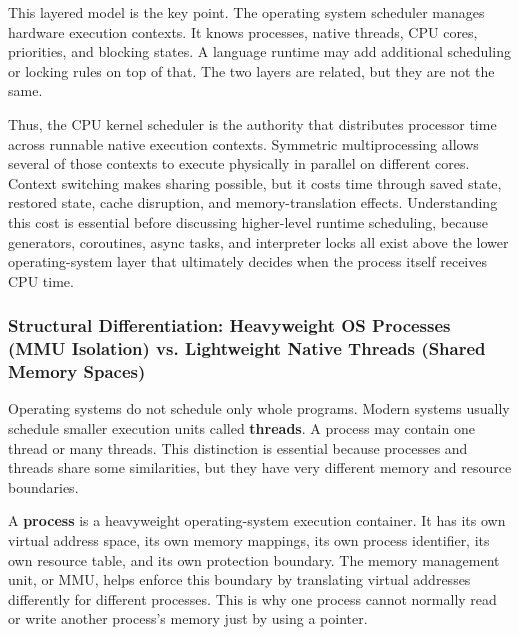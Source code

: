 This layered model is the key point. The operating system scheduler manages hardware execution contexts. It knows processes, native threads, CPU cores, priorities, and blocking states. A language runtime may add additional scheduling or locking rules on top of that. The two layers are related, but they are not the same.

Thus, the CPU kernel scheduler is the authority that distributes processor time across runnable native execution contexts. Symmetric multiprocessing allows several of those contexts to execute physically in parallel on different cores. Context switching makes sharing possible, but it costs time through saved state, restored state, cache disruption, and memory-translation effects. Understanding this cost is essential before discussing higher-level runtime scheduling, because generators, coroutines, async tasks, and interpreter locks all exist above the lower operating-system layer that ultimately decides when the process itself receives CPU time.







































\subsubsection{Structural Differentiation: Heavyweight OS Processes (MMU Isolation) vs. Lightweight Native Threads (Shared Memory Spaces)}

Operating systems do not schedule only whole programs. Modern systems usually schedule smaller execution units called \textbf{threads}. A process may contain one thread or many threads. This distinction is essential because processes and threads share some similarities, but they have very different memory and resource boundaries.

A \textbf{process} is a heavyweight operating-system execution container. It has its own virtual address space, its own memory mappings, its own process identifier, its own resource table, and its own protection boundary. The memory management unit, or MMU, helps enforce this boundary by translating virtual addresses differently for different processes. This is why one process cannot normally read or write another process's memory just by using a pointer.

